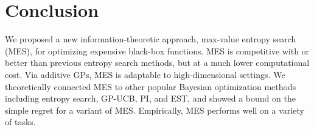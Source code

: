 \section{Conclusion}
We proposed a new information-theoretic approach, max-value entropy search (MES), for optimizing expensive black-box functions. MES is competitive with or better than previous entropy search methods, but at a much lower computational cost. Via additive GPs, MES is adaptable to high-dimensional settings. We theoretically connected MES to other popular Bayesian optimization methods including entropy search, GP-UCB, PI, and EST, and showed a bound on the simple regret for a variant of MES. Empirically, MES performs well on a variety of tasks.
